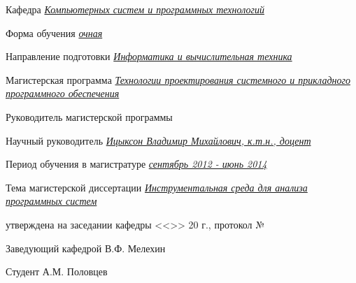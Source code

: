 \begin{flushleft}
    Кафедра \uline{\textit{Компьютерных систем и программных технологий} \hfill}

    \uline{\hfill}

    Форма обучения \uline{\textit{очная} \hfill}

    Направление подготовки \uline{\textit{Информатика и вычислительная техника} \hfill}

    \uline{\hfill}

    Магистерская программа \textit{\uline{Технологии проектирования системного и прикладного программного обеспечения\hfill}}

    \vspace{1em}

    Руководитель магистерской программы \uline{\hfill}

    \uline{\hfill}

    Научный руководитель \uline{\textit{Ицыксон Владимир Михайлович, к.т.н., доцент} \hfill}

    Период обучения в магистратуре \uline{\textit{сентябрь 2012 - июнь 2014} \hfill}

    Тема магистерской диссертации \textit{\uline{Инструментальная среда для анализа программных систем \hfill}}

    \vspace{1em}

    утверждена на заседании кафедры <<\uline{\hphantom{200}}>> \uline{\hphantom{декабрь}}
    20\uline{\hphantom{130}} г., протокол № \uline{\hphantom{1300}}

    \vspace{1em}

    Заведующий кафедрой \uline{\hfill} В.Ф. Мелехин

    \vspace{1em}

    Студент \uline{\hfill} А.М. Половцев
\end{flushleft}
